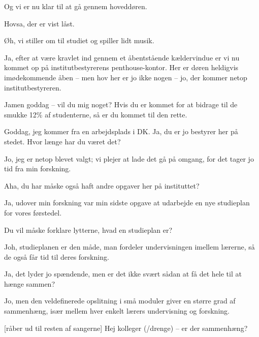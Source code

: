 \documentclass[a4paper,11pt]{article}
\begin{document}
\begin{sketch}
   Og vi er nu klar til at gå gennem hoveddøren.



   Hovsa, der er vist låst.


   Øh, vi stiller om til studiet og spiller lidt musik.


   Ja, efter at være kravlet ind gennem et åbentstående
  kældervindue er vi nu kommet op på institutbestyrerens
  penthouse-kontor.  Her er døren heldigvis imødekommende åben -- men
  hov her er jo ikke nogen -- jo, der kommer netop institutbestyreren.

   Jamen goddag -- vil du mig noget?  Hvis du er kommet for
  at bidrage til de smukke 12\% af studenterne, så er du kommet til
  den rette.


   Goddag, jeg kommer fra en arbejdsplads i DK.  Ja, du er jo
  bestyrer her på stedet.  Hvor længe har du været det?

   Jo, jeg er netop blevet valgt; vi plejer at lade det gå på
  omgang, for det tager jo tid fra min forskning.

   Aha, du har måske også haft andre opgaver her på instituttet?

   Ja, udover min forskning var min sidste opgave at udarbejde
  en nye studieplan for vores førstedel.

   Du vil måske forklare lytterne, hvad en studieplan er?

   Joh, studieplanen er den måde, man fordeler undervisningen
  imellem lærerne, så de også får tid til deres forskning.

   Ja, det lyder jo spændende, men er det ikke svært sådan at
  få det hele til at hænge sammen?

   Jo, men den veldefinerede opslitning i små moduler giver
  en større grad af sammenhæng, især mellem hver enkelt lærers
  undervisning og forskning.

  [råber ud til resten af sangerne] Hej kolleger (/drenge) --
  er der sammenhæng?

\end{sketch}
\end{document}
